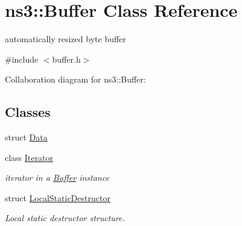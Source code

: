 \hypertarget{classns3_1_1Buffer}{}\section{ns3\+:\+:Buffer Class Reference}
\label{classns3_1_1Buffer}


automatically resized byte buffer  




{\ttfamily \#include $<$buffer.\+h$>$}



Collaboration diagram for ns3\+:\+:Buffer\+:
\subsection*{Classes}
\begin{DoxyCompactItemize}
\item 
struct \hyperlink{structns3_1_1Buffer_1_1Data}{Data}
\item 
class \hyperlink{classns3_1_1Buffer_1_1Iterator}{Iterator}
\begin{DoxyCompactList}\small\item\em iterator in a \hyperlink{classns3_1_1Buffer}{Buffer} instance \end{DoxyCompactList}\item 
struct \hyperlink{structns3_1_1Buffer_1_1LocalStaticDestructor}{Local\+Static\+Destructor}
\begin{DoxyCompactList}\small\item\em Local static destructor structure. \end{DoxyCompactList}\end{DoxyCompactItemize}
